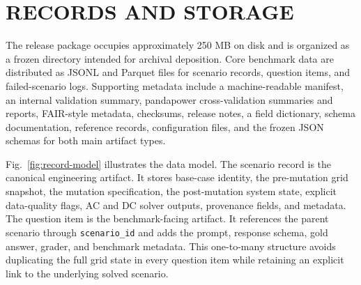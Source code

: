 \section*{RECORDS AND STORAGE}


The release package occupies approximately 250 MB on disk and is organized as a frozen directory intended for archival deposition. Core benchmark data are distributed as JSONL and Parquet files for scenario records, question items, and failed-scenario logs. Supporting metadata include a machine-readable manifest, an internal validation summary, pandapower cross-validation summaries and reports, FAIR-style metadata, checksums, release notes, a field dictionary, schema documentation, reference records, configuration files, and the frozen JSON schemas for both main artifact types.

Fig.~\ref{fig:record-model} illustrates the data model. The scenario record is the canonical engineering artifact. It stores base-case identity, the pre-mutation grid snapshot, the mutation specification, the post-mutation system state, explicit data-quality flags, AC and DC solver outputs, provenance fields, and metadata. The question item is the benchmark-facing artifact. It references the parent scenario through \texttt{scenario\_id} and adds the prompt, response schema, gold answer, grader, and benchmark metadata. This one-to-many structure avoids duplicating the full grid state in every question item while retaining an explicit link to the underlying solved scenario.

